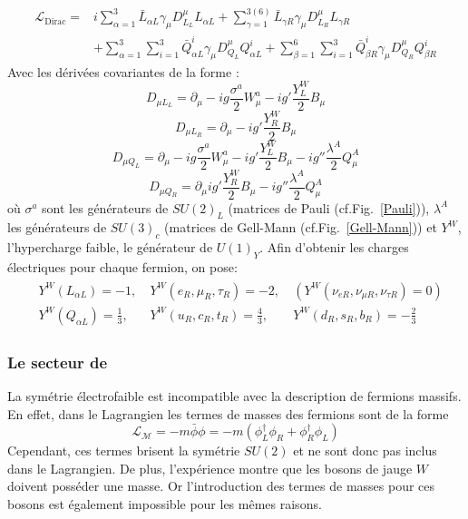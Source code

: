 \begin{equation}
\begin{split}
\mathcal{L}_{\mathrm{Dirac}}=&i\sum_{\alpha=1}^{3}\bar{L}_{\alpha L}\gamma_{\mu}D_{L_{L}}^{\mu}L_{\alpha L}+\sum_{\gamma=1}^{3(6)}\bar{L}_{\gamma R}\gamma_{\mu}D_{L_{R}}^{\mu}L_{\gamma R}\\
&+\sum_{\alpha=1}^{3}\sum_{i=1}^{3}\bar{Q}_{\alpha L}^{i}\gamma_{\mu}D_{Q_{L}}^{\mu}Q_{\alpha L}^{i}+\sum_{\beta=1}^{6}\sum_{i=1}^{3}\bar{Q}_{\beta R}^{i}\gamma_{\mu}D_{Q_{R}}^{\mu}Q_{\beta R}^{i}
\end{split}
\end{equation}
Avec les dérivées covariantes de la forme : 
\begin{equation}
D_{\mu L_{L}}=\partial_{\mu} -ig\frac{\sigma^a}{2}W_{\mu}^{a}-ig'\frac{Y^{W}_{L}}{2}B_{\mu}
\end{equation}
\begin{equation}
D_{\mu L_{R}}=\partial_{\mu} -ig'\frac{Y^{W}_{R}}{2}B_{\mu}
\end{equation}
\begin{equation}
D_{\mu Q_{L}}=\partial_{\mu} -ig\frac{\sigma^a}{2}W_{\mu}^{a}-ig'\frac{Y^{W}_{L}}{2}B_{\mu}-ig''\frac{\lambda^{A}}{2}Q_{\mu}^{A}
\end{equation}
\begin{equation}
D_{\mu Q_{R}}=\partial_{\mu}ig'\frac{Y^{W}_{R}}{2}B_{\mu}-ig''\frac{\lambda^{A}}{2}Q_{\mu}^{A}
\end{equation}
où $\sigma^{a}$ sont les générateurs de $SU(2)_{L}$ (matrices de Pauli (cf.Fig.~\ref{Pauli})), $\lambda^{A}$ les générateurs de $SU(3)_{c}$ (matrices de Gell-Mann (cf.Fig.~\ref{Gell-Mann})) et $Y^{W}$, l'hypercharge faible, le générateur de $U(1)_{Y}$. 
Afin d'obtenir les charges électriques pour chaque fermion, on pose:
\begin{multline}
\begin{split}
&Y^W(L_{\alpha L})=-1,\ &Y^W(e_{R},\mu_{R},\tau_{R})=-2,\ &\left(Y^W(\nu_{e R},\nu_{\mu R},\nu_{\tau R})=0\right)\\
&Y^W(Q_{\alpha L})=\frac{1}{3},\ &Y^W(u_{R},c_{R},t_{R})=\frac{4}{3},\ &Y^W(d_{R},s_{R},b_{R})=-\frac{2}{3}
\end{split}
\end{multline}  


\subsubsection{Le secteur de } 
La symétrie électrofaible est incompatible avec la description de fermions massifs. En effet, dans le Lagrangien les termes de masses des fermions sont de la forme 
\begin{equation}
\mathcal{L_{M}}=-m\bar{\phi}\phi=-m \left(\phi_{L}^{\dagger}\phi_{R}+\phi_{R}^{\dagger}\phi_{L}\right)
\end{equation}
Cependant, ces termes brisent la symétrie $SU(2)$ et ne sont donc pas inclus dans le Lagrangien. De plus, l'expérience montre que les bosons de jauge $W$ doivent posséder une masse. Or l'introduction des termes de masses pour ces bosons est également impossible pour les mêmes raisons.

